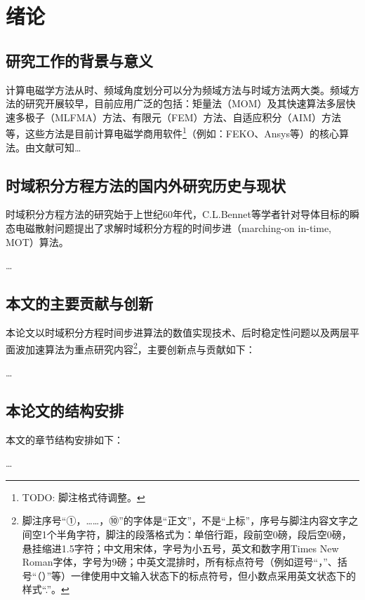 \chapter{绪论}

\section{研究工作的背景与意义}

计算电磁学方法\Cite{wang1999sanwei, liuxf2006, zhu1973wulixue, chen2001hao, gu2012lao, feng997he}从时、频域角度划分可以分为频域方法与时域方法两大类。频域方法的研究开展较早，目前应用广泛的包括：矩量法（MOM）\Cite{xiao2012yi,zhong1994zhong}及其快速算法多层快速多极子（MLFMA）\Cite{clerc2010discrete}方法、有限元（FEM）\Cite{wang1999sanwei,zhu1973wulixue}方法、自适应积分（AIM）\Cite{gu2012lao}方法等，这些方法是目前计算电磁学商用软件\footnote{TODO: 脚注格式待调整。}（例如：FEKO、Ansys等）的核心算法。由文献\cite{feng997he,clerc2010discrete,xiao2012yi}可知\ldots

\section{时域积分方程方法的国内外研究历史与现状}

时域积分方程方法的研究始于上世纪60年代，C.L.Bennet等学者针对导体目标的瞬态电磁散射问题提出了求解时域积分方程的时间步进（marching-on in-time, MOT）算法\Cite{zhong1994zhong}。

\ldots

\section{本文的主要贡献与创新}

本论文以时域积分方程时间步进算法的数值实现技术、后时稳定性问题以及两层平面波加速算法为重点研究内容\footnote{脚注序号“①，……，⑩”的字体是“正文”，不是“上标”，序号与脚注内容文字之间空1个半角字符，脚注的段落格式为：单倍行距，段前空0磅，段后空0磅，悬挂缩进1.5字符；中文用宋体，字号为小五号，英文和数字用Times New Roman字体，字号为9磅；中英文混排时，所有标点符号（例如逗号“，”、括号“（）”等）一律使用中文输入状态下的标点符号，但小数点采用英文状态下的样式“.”。}，主要创新点与贡献如下：

\ldots

\section{本论文的结构安排}

本文的章节结构安排如下：

\ldots
